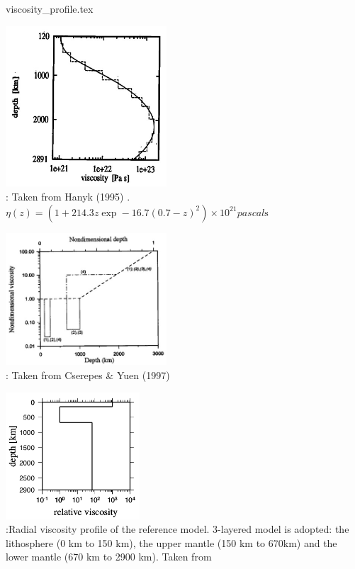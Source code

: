 \begin{flushright} {\tiny {\color{gray} viscosity\_profile.tex}} \end{flushright}


\begin{center}
\includegraphics[width=6cm]{images/viscosity_profile/hamy95}\\
{\captionfont \nineteenninetyfive: Taken from Hanyk \etal (1995) \cite{hamy95}. 
$\eta(z)=(1+214.3z\exp-16.7(0.7-z)^2)\times 10^{21}\si{pascal\second}$ }
\end{center}

\begin{center}
\includegraphics[width=6cm]{images/viscosity_profile/csyu97}\\
{\captionfont \nineteenninetyseven: Taken from Cserepes \& Yuen (1997) \cite{csyu97}} 
\end{center}

\begin{center}
\includegraphics[width=5cm]{images/viscosity_profile/yohk01}\\
{\captionfont \twothousandone:Radial viscosity profile of the reference model. 3-layered model is adopted: 
the lithosphere (0 km to 150 km), the upper mantle (150 km to 670km) 
and the lower mantle (670 km to 2900 km). Taken from \cite{yohk01}}
\end{center}


